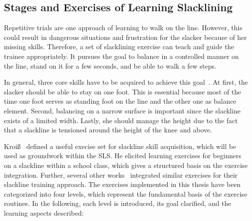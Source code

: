 \subsection{Stages and Exercises of Learning Slacklining}\label{3_3_2_StagesExercises}
Repetitive trials are one approach of learning to walk on the line. However, this could result in dangerous situations and frustration for the slacker because of her missing skills. Therefore, a set of slacklining exercise can teach and guide the trainee appropriately. It pursues the goal to balance in a controlled manner on the line, stand on it for a few seconds, and be able to walk a few steps. 

In general, three core skills have to be acquired to achieve this goal~\cite{Kroiss2007-ab}. At first, the slacker should be able to stay on one foot. This is essential because most of the time one foot serves as standing foot on the line and the other one as balance element. Second, balancing on a narrow surface is important since the slackline exists of a limited width. Lastly, she should manage the height due to the fact that a slackline is tensioned around the height of the knee and above.

Kroiß~\cite{Kroiss2007-ab} defined a useful execise set for slackline skill acquisition, which will be used as groundwork within the SLS. He elicited learning exercises for beginners on a slackline within a school class, which gives a structured basis on the exercise integration. Further, several other works~\cite{Balcom2005-wl, Donath2013-kk, Donath2016-gm, Granacher2010-ow, Keller2012-xh, Kleindl2011-bl, Pfusterschmied2013-yy, Thomann2013-aa} integrated similar exercises for their slackline training approach. The exercises implemented in this thesis have been categorized into four levels, which represent the fundamental basis of the exercise routines. In the following, each level is introduced, its goal clarified, and the learning aspects described:


